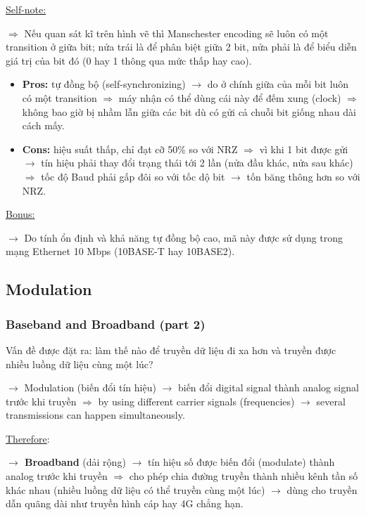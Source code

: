 \noindent
\underline{Self-note:}

$\Rightarrow$ Nếu quan sát kĩ trên hình vẽ thì Manschester encoding sẽ luôn có một transition ở giữa bit; nửa trái là để phân biệt giữa 2 bit, nửa phải là để biểu diễn giá trị của bit đó (0 hay 1 thông qua mức thấp hay cao).
\medskip

\begin{itemize}
    \item \textbf{Pros:} tự đồng bộ (self-synchronizing) $\rightarrow$ do ở chính giữa của mỗi bit luôn có một transition $\Rightarrow$ máy nhận có thể dùng cái này để đếm xung (clock) $\Rightarrow$ không bao giờ bị nhầm lẫn giữa các bit dù có gửi cả chuỗi bit giống nhau dài cách mấy.
    \item \textbf{Cons:} hiệu suất thấp, chỉ đạt cỡ 50\% so với NRZ $\Rightarrow$ vì khi 1 bit được gửi $\rightarrow$ tín hiệu phải thay đổi trạng thái tới 2 lần (nửa đầu khác, nửa sau khác) $\Rightarrow$ tốc độ Baud phải gấp đôi so với tốc dộ bit $\rightarrow$ tốn băng thông hơn so với NRZ.
\end{itemize}

\noindent
\underline{Bonus:} 

$\rightarrow$ Do tính ổn định và khả năng tự đồng bộ cao, mã này được sử dụng trong mạng Ethernet 10 Mbps (10BASE-T hay 10BASE2).
\medskip

\subsection{Modulation}

\subsubsection{Baseband and Broadband (part 2)}

\noindent
Vấn đề được đặt ra: làm thế nào để truyền dữ liệu đi xa hơn và truyền được nhiều luồng dữ liệu cùng một lúc?

$\rightarrow$ Modulation (biến đổi tín hiệu) $\rightarrow$ biến đổi digital signal thành analog signal trước khi truyền $\Rightarrow$ by using different carrier signals (frequencies) $\rightarrow$ several transmissions can happen simultaneously.
\medskip

\noindent
\underline{Therefore}:

\textbf{$\rightarrow$ Broadband} (dải rộng) $\rightarrow$ tín hiệu số được biến đổi (modulate) thành analog trước khi truyền $\Rightarrow$ cho phép chia đường truyền thành nhiều kênh tần số khác nhau (nhiều luồng dữ liệu có thể truyền cùng một lúc) $\rightarrow$ dùng cho truyền dẫn quãng dài như truyền hình cáp hay 4G chẳng hạn.
\medskip

